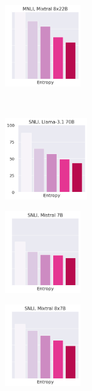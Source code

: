 \begin{figure}[t]
\begin{subfigure}[b]{0.23\textwidth}
    \end{subfigure}
    \begin{subfigure}[b]{0.23\textwidth}
        \includegraphics[height=3.6cm]{figures/appendix/entropy_acc_mnli_matched_8x22B}
    \end{subfigure}\\
    \begin{subfigure}[b]{0.23\textwidth}
        \includegraphics[height=3.6cm]{figures/appendix/entropy_acc_snli_70B}
    \end{subfigure}
    \begin{subfigure}[b]{0.23\textwidth}
        \includegraphics[height=3.6cm]{figures/appendix/entropy_acc_snli_7B}
    \end{subfigure}
    \begin{subfigure}[b]{0.23\textwidth}
        \includegraphics[height=3.6cm]{figures/appendix/entropy_acc_snli_8x7B}
    \end{subfigure}

\end{figure}
